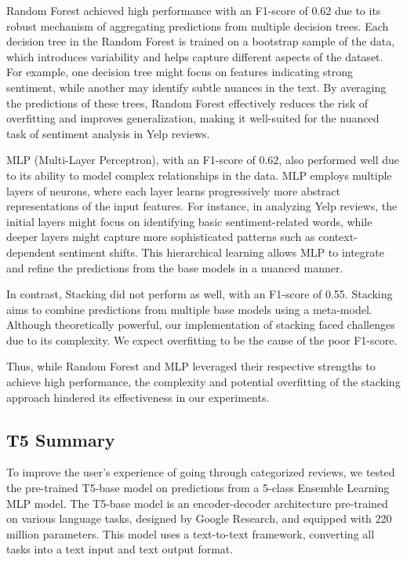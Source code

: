\documentclass[12pt]{article}
\begin{document}
Random Forest achieved high performance with an F1-score of 0.62 due to its robust mechanism of aggregating predictions from multiple decision trees. Each decision tree in the Random Forest is trained on a bootstrap sample of the data, which introduces variability and helps capture different aspects of the dataset. For example, one decision tree might focus on features indicating strong sentiment, while another may identify subtle nuances in the text. By averaging the predictions of these trees, Random Forest effectively reduces the risk of overfitting and improves generalization, making it well-suited for the nuanced task of sentiment analysis in Yelp reviews.

MLP (Multi-Layer Perceptron), with an F1-score of 0.62, also performed well due to its ability to model complex relationships in the data. MLP employs multiple layers of neurons, where each layer learns progressively more abstract representations of the input features. For instance, in analyzing Yelp reviews, the initial layers might focus on identifying basic sentiment-related words, while deeper layers might capture more sophisticated patterns such as context-dependent sentiment shifts. This hierarchical learning allows MLP to integrate and refine the predictions from the base models in a nuanced manner.

In contrast, Stacking did not perform as well, with an F1-score of 0.55. Stacking aims to combine predictions from multiple base models using a meta-model. Although theoretically powerful, our implementation of stacking faced challenges due to its complexity. We expect overfitting to be the cause of the poor F1-score.

Thus, while Random Forest and MLP leveraged their respective strengths to achieve high performance, the complexity and potential overfitting of the stacking approach hindered its effectiveness in our experiments.

\subsection{T5 Summary}
To improve the user’s experience of going through categorized reviews, we tested the pre-trained T5-base model on predictions from a 5-class Ensemble Learning MLP model. The T5-base model is an encoder-decoder architecture pre-trained on various language tasks, designed by Google Research, and equipped with 220 million parameters. This model uses a text-to-text framework, converting all tasks into a text input and text output format.
\end{document}
